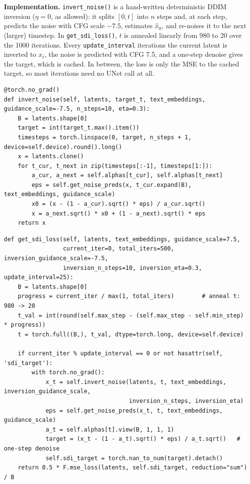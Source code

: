 \noindent\textbf{Implementation.}
\texttt{invert\_noise()} is a hand-written deterministic DDIM inversion ($\eta = 0$, as allowed): it splits $[0, t]$ into $n$ steps and, at each step, predicts the noise with CFG scale $-7.5$, estimates $\hat x_0$, and re-noises it to the next (larger) timestep.
In \texttt{get\_sdi\_loss()}, $t$ is annealed linearly from 980 to 20 over the 1000 iterations.
Every \texttt{update\_interval} iterations the current latent is inverted to $x_t$, the noise is predicted with CFG 7.5, and a one-step denoise gives the target, which is cached.
In between, the loss is only the MSE to the cached target, so most iterations need no UNet call at all.

\begin{lstlisting}
@torch.no_grad()
def invert_noise(self, latents, target_t, text_embeddings, guidance_scale=-7.5, n_steps=10, eta=0.3):
    B = latents.shape[0]
    target = int(target_t.max().item())
    timesteps = torch.linspace(0, target, n_steps + 1, device=self.device).round().long()
    x = latents.clone()
    for t_cur, t_next in zip(timesteps[:-1], timesteps[1:]):
        a_cur, a_next = self.alphas[t_cur], self.alphas[t_next]
        eps = self.get_noise_preds(x, t_cur.expand(B), text_embeddings, guidance_scale)
        x0 = (x - (1 - a_cur).sqrt() * eps) / a_cur.sqrt()
        x = a_next.sqrt() * x0 + (1 - a_next).sqrt() * eps
    return x
\end{lstlisting}

\begin{lstlisting}
def get_sdi_loss(self, latents, text_embeddings, guidance_scale=7.5,
                 current_iter=0, total_iters=500, inversion_guidance_scale=-7.5,
                 inversion_n_steps=10, inversion_eta=0.3, update_interval=25):
    B = latents.shape[0]
    progress = current_iter / max(1, total_iters)        # anneal t: 980 -> 20
    t_val = int(round(self.max_step - (self.max_step - self.min_step) * progress))
    t = torch.full((B,), t_val, dtype=torch.long, device=self.device)

    if current_iter % update_interval == 0 or not hasattr(self, 'sdi_target'):
        with torch.no_grad():
            x_t = self.invert_noise(latents, t, text_embeddings, inversion_guidance_scale,
                                    inversion_n_steps, inversion_eta)
            eps = self.get_noise_preds(x_t, t, text_embeddings, guidance_scale)
            a_t = self.alphas[t].view(B, 1, 1, 1)
            target = (x_t - (1 - a_t).sqrt() * eps) / a_t.sqrt()   # one-step denoise
            self.sdi_target = torch.nan_to_num(target).detach()
    return 0.5 * F.mse_loss(latents, self.sdi_target, reduction="sum") / B
\end{lstlisting}
